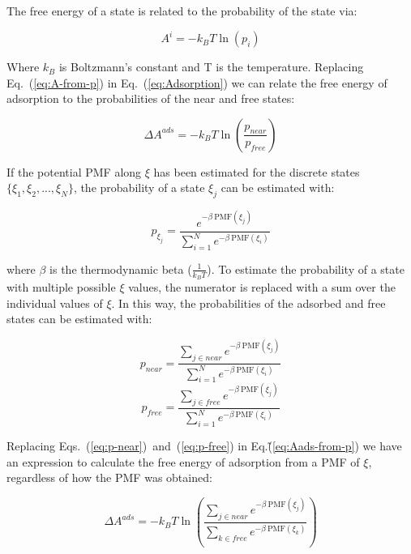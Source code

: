 \documentclass[twoside,twocolumn,9pt]{article}
\begin{document}
The free energy of a state is related to the probability of the state
via:

\begin{equation}
\label{eq:A-from-p}
A^i = - k_B T \ln (p_i)
\end{equation}

Where $k_B$ is Boltzmann's constant and T is the
temperature. Replacing Eq.~(\ref{eq:A-from-p}) in
Eq.~(\ref{eq:Adsorption}) we can relate the free energy of adsorption
to the probabilities of the near and free states:

\begin{equation}
\label{eq:Aads-from-p}
\Delta A^{ads} = - k_B T \ln (\frac{p_{near}}{p_{free}})
\end{equation}

If the potential PMF along $\xi$ has been estimated for the discrete
states $\{\xi_1, \xi_2, ..., \xi_N \}$, the probability of a state
$\xi_{j}$ can be estimated with:

\begin{equation}
\label{eq:p-from-PMF}
p_{\xi_j} = \frac{e^{-\beta~\mathrm{PMF}(\xi_j)}}{\sum_{i=1}^N e^{-\beta~\mathrm{PMF}(\xi_i)}}
\end{equation}

where $\beta$ is the thermodynamic beta ($\frac{1}{k_{B}T}$). To
estimate the probability of a state with multiple possible $\xi$
values, the numerator is replaced with a sum over the individual
values of $\xi$. In this way, the probabilities of the adsorbed and
free states can be estimated with:

\begin{equation}
\label{eq:p-near}
p_{near} = \frac{\sum_{j \in near} e^{-\beta~\mathrm{PMF}(\xi_j)}}{\sum_{i=1}^N e^{-\beta~\mathrm{PMF}(\xi_i)}}
\end{equation}
\begin{equation}
\label{eq:p-free}
p_{free} = \frac{\sum_{j \in free} e^{-\beta~\mathrm{PMF}(\xi_j)}}{\sum_{i=1}^N e^{-\beta~\mathrm{PMF}(\xi_i)}}
\end{equation}

Replacing Eqs.~(\ref{eq:p-near})~and~(\ref{eq:p-free}) in
Eq.\~(\ref{eq:Aads-from-p}) we have an expression to calculate the
free energy of adsorption from a PMF of $\xi$, regardless of how the
PMF was obtained:

\begin{equation}
\label{eq:Aads-from-PMF}
\Delta A^{ads} = - k_B T \ln \left(\frac{\sum_{j \in near} e^{-\beta~\mathrm{PMF}(\xi_j)}}{\sum_{k \in free} e^{-\beta~\mathrm{PMF}(\xi_k)}}\right)
\end{equation}
\end{document}
